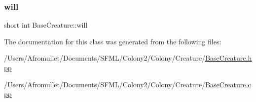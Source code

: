 \mbox{\label{class_base_creature_a992cbd3a6be93279f2c933a50eba5000}} 
\subsubsection{\texorpdfstring{will}{will}}
{\footnotesize\ttfamily short int Base\+Creature\+::will\hspace{0.3cm}{\ttfamily [private]}}



The documentation for this class was generated from the following files\+:\begin{DoxyCompactItemize}
\item 
/\+Users/\+Afromullet/\+Documents/\+S\+F\+M\+L/\+Colony2/\+Colony/\+Creature/\mbox{\hyperlink{_base_creature_8hpp}{Base\+Creature.\+hpp}}\item 
/\+Users/\+Afromullet/\+Documents/\+S\+F\+M\+L/\+Colony2/\+Colony/\+Creature/\mbox{\hyperlink{_base_creature_8cpp}{Base\+Creature.\+cpp}}\end{DoxyCompactItemize}
